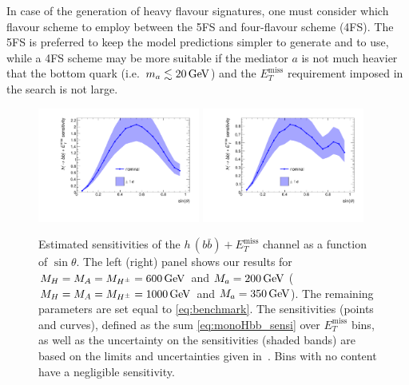 \documentclass[a4paper, 11pt,notoc]{article}
\newcommand{\MET}{\ensuremath{E_T^\mathrm{miss}}\xspace}
\newcommand{\met}{\MET}
\newcommand{\mA}{\ensuremath{M_{A}}\xspace}
\newcommand{\ma}{\ensuremath{M_{a}}\xspace}
\newcommand{\mH}{\ensuremath{M_{H}}\xspace}
\newcommand{\mHc}{\ensuremath{M_{H^{\pm}}}\xspace}
\begin{document}
In case of the generation of heavy flavour signatures, one must consider which flavour scheme to employ between the 5FS and four-flavour scheme (4FS). The 5FS is preferred to keep the model predictions simpler to generate and to use, while a 4FS scheme may be more suitable if the mediator $a$ is not much heavier that the bottom quark (i.e.~$m_a \lesssim 20 \, {\rm GeV}$) and the $\MET$ requirement imposed in the search is not large. 


\begin{figure}[t!]
\centering
\includegraphics[width=0.475\textwidth]{monoHbb_sinp_scan_1_sensi_1D.pdf} \quad 
\includegraphics[width=0.475\textwidth]{monoHbb_sinp_scan_2_sensi_1D.pdf}
\vspace{4mm}
\caption{Estimated sensitivities of  the $h \, (b \bar b)+\MET$ channel as a function of $\sin \theta$. The left (right) panel shows our results for $\mH = \mA = \mHc = 600 \, {\rm GeV}$ and $\ma = 200 \, {\rm GeV}$ ($\mH = \mA = \mHc = 1000 \, {\rm GeV}$ and $\ma = 350 \, {\rm GeV}$).  The remaining parameters are set equal to \eqref{eq:benchmark}. The sensitivities (points and curves), defined as the sum \eqref{eq:monoHbb_sensi} over \met bins, as well as the uncertainty on the sensitivities (shaded bands)  are based on the limits and uncertainties given in~\cite{Aaboud:2017yqz}. Bins with no content have a negligible sensitivity. }
\label{fig:monoHbb_appendix1}
\end{figure}
\end{document}
